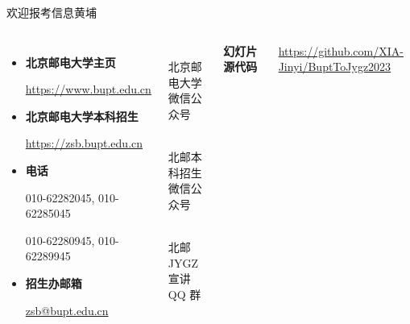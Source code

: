 \documentclass[aspectratio=169, utf8, fontset=windows]{beamer}
\begin{document}
\begin{frame}{欢迎报考信息黄埔}
    \small
    \begin{columns}
        \begin{itemize}
            \item \textcolor{Fore}{\textbf{北京邮电大学主页}}

                  \href{https://www.bupt.edu.cn}{https://www.bupt.edu.cn}

            \item \textcolor{Fore}{\textbf{北京邮电大学本科招生}}

                  \href{https://zsb.bupt.edu.cn}{https://zsb.bupt.edu.cn}

            \item \textcolor{Fore}{\textbf{电话}}

                  010-62282045, 010-62285045

                  010-62280945, 010-62289945

            \item \textcolor{Fore}{\textbf{招生办邮箱}}

                  \href{mailto://zsb@bupt.edu.cn}{zsb@bupt.edu.cn}
        \end{itemize}

        \begin{multicols}{3}
            \begin{center}
                \\[1em]

                \scriptsize
                北京邮电大学\\微信公众号
            \end{center}

            \begin{center}
                \\[1em]

                \scriptsize
                北邮本科招生\\微信公众号
            \end{center}

            \begin{center}
                \\[1em]

                \scriptsize
                北邮 JYGZ\\宣讲 QQ 群
            \end{center}

        \end{multicols}

        \textcolor{Fore}{\textbf{幻灯片源代码}}

        \href{https://github.com/XIA-Jinyi/BuptToJygz2023}{https://github.com/XIA-Jinyi/BuptToJygz2023}
    \end{columns}
\end{frame}
\end{document}
